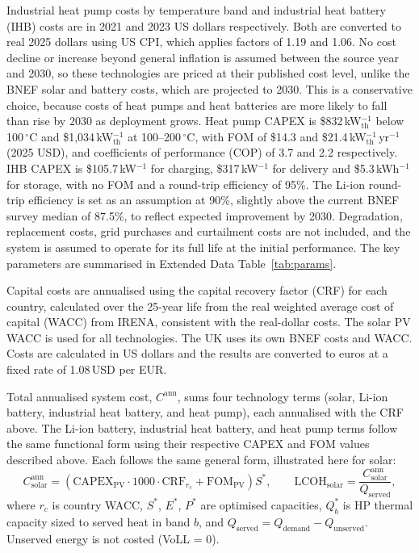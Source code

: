 \documentclass[11pt]{article}
\newcommand{\PV}{\mathrm{PV}}
\begin{document}
Industrial heat pump costs by temperature band\cite{rissman2020} and industrial heat battery (IHB) costs\cite{rissman2023ihb} are in 2021 and 2023 US dollars respectively. Both are converted to real 2025 dollars using US CPI, which applies factors of 1.19 and 1.06. No cost decline or increase beyond general inflation is assumed between the source year and 2030, so these technologies are priced at their published cost level, unlike the BNEF solar and battery costs, which are projected to 2030. This is a conservative choice, because costs of heat pumps and heat batteries are more likely to fall than rise by 2030 as deployment grows. Heat pump CAPEX is \$832\,kW$_\mathrm{th}^{-1}$ below 100\,$^\circ$C and \$1,034\,kW$_\mathrm{th}^{-1}$ at 100--200\,$^\circ$C, with FOM of \$14.3 and \$21.4\,kW$_\mathrm{th}^{-1}$\,yr$^{-1}$ (2025 USD), and coefficients of performance (COP) of 3.7 and 2.2 respectively\cite{rissman2020}. IHB CAPEX is \$105.7\,kW$^{-1}$ for charging, \$317\,kW$^{-1}$ for delivery and \$5.3\,kWh$^{-1}$ for storage, with no FOM and a round-trip efficiency of 95\%\cite{rissman2023ihb}. The Li-ion round-trip efficiency is set as an assumption at 90\%, slightly above the current BNEF survey median of 87.5\%, to reflect expected improvement by 2030. Degradation, replacement costs, grid purchases and curtailment costs are not included, and the system is assumed to operate for its full life at the initial performance. The key parameters are summarised in Extended Data Table~\ref{tab:params}.

Capital costs are annualised using the capital recovery factor (CRF) for each country, calculated over the 25-year life from the real weighted average cost of capital (WACC) from IRENA\cite{irena2025}, consistent with the real-dollar costs. The solar PV WACC is used for all technologies. The UK uses its own BNEF costs and WACC. Costs are calculated in US dollars and the results are converted to euros at a fixed rate of 1.08\,USD per EUR.

Total annualised system cost, $C^{\mathrm{ann}}$, sums four technology terms (solar, Li-ion battery, industrial heat battery, and heat pump), each annualised with the CRF above. The Li-ion battery, industrial heat battery, and heat pump terms follow the same functional form using their respective CAPEX and FOM values described above. Each follows the same general form, illustrated here for solar:
\begin{equation}
C^{\mathrm{ann}}_{\mathrm{solar}} = \left(\mathrm{CAPEX}_{\PV}\cdot 1000 \cdot \mathrm{CRF}_{r_c} + \mathrm{FOM}_{\PV}\right) S^{*}, \qquad
\mathrm{LCOH}_{\mathrm{solar}} = \frac{C^{\mathrm{ann}}_{\mathrm{solar}}}{Q_{\mathrm{served}}},
\end{equation}
where $r_c$ is country WACC, $S^*$, $E^*$, $P^*$ are optimised capacities, $Q_b^*$ is HP thermal capacity sized to served heat in band $b$, and $Q_{\mathrm{served}}=Q_{\mathrm{demand}}-Q_{\mathrm{unserved}}$. Unserved energy is not costed (VoLL = 0).
\end{document}
